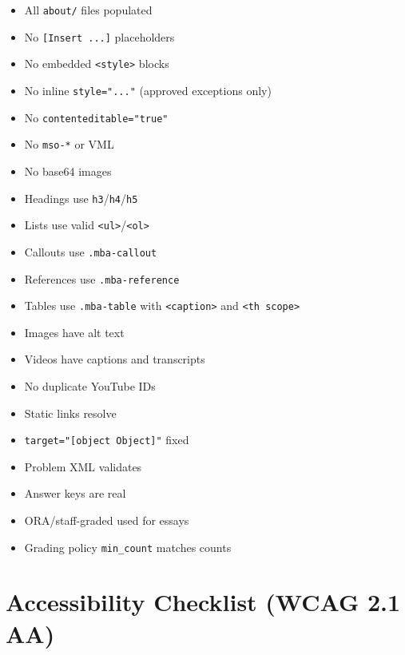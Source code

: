 \begin{itemize}
  \item[$\square$] All \texttt{about/} files populated
  \item[$\square$] No \texttt{[Insert ...]} placeholders
  \item[$\square$] No embedded \texttt{<style>} blocks
  \item[$\square$] No inline \texttt{style="..."} (approved exceptions only)
  \item[$\square$] No \texttt{contenteditable="true"}
  \item[$\square$] No \texttt{mso-*} or VML
  \item[$\square$] No base64 images
  \item[$\square$] Headings use \texttt{h3}/\texttt{h4}/\texttt{h5}
  \item[$\square$] Lists use valid \texttt{<ul>}/\texttt{<ol>}
  \item[$\square$] Callouts use \texttt{.mba-callout}
  \item[$\square$] References use \texttt{.mba-reference}
  \item[$\square$] Tables use \texttt{.mba-table} with \texttt{<caption>} and \texttt{<th scope>}
  \item[$\square$] Images have alt text
  \item[$\square$] Videos have captions and transcripts
  \item[$\square$] No duplicate YouTube IDs
  \item[$\square$] Static links resolve
  \item[$\square$] \texttt{target="[object Object]"} fixed
  \item[$\square$] Problem XML validates
  \item[$\square$] Answer keys are real
  \item[$\square$] ORA/staff-graded used for essays
  \item[$\square$] Grading policy \texttt{min\_count} matches counts
\end{itemize}

\section{Accessibility Checklist (WCAG 2.1 AA)}

